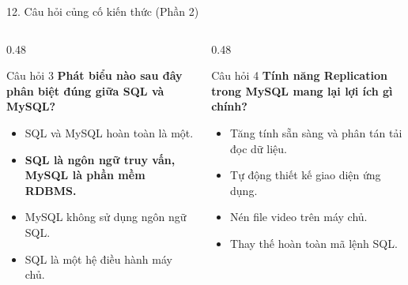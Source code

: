 \documentclass[aspectratio=169,11pt]{beamer}
\begin{document}
\begin{frame}{12. Câu hỏi củng cố kiến thức (Phần 2)}
\begin{columns}[t]
  \begin{column}{0.48\textwidth}
    \begin{exampleblock}{Câu hỏi 3}
      \textbf{Phát biểu nào sau đây phân biệt đúng giữa SQL và MySQL?}
      \begin{itemize}\small
        \item[A.] SQL và MySQL hoàn toàn là một.
        \item[B.] \textbf{SQL là ngôn ngữ truy vấn, MySQL là phần mềm RDBMS.} \quad \checkmark
        \item[C.] MySQL không sử dụng ngôn ngữ SQL.
        \item[D.] SQL là một hệ điều hành máy chủ.
      \end{itemize}
    \end{exampleblock}
  \end{column}
  \begin{column}{0.48\textwidth}
    \begin{exampleblock}{Câu hỏi 4}
      \textbf{Tính năng Replication trong MySQL mang lại lợi ích gì chính?}
      \begin{itemize}\small
        \item[A.] Tăng tính sẵn sàng và phân tán tải đọc dữ liệu. \quad \checkmark
        \item[B.] Tự động thiết kế giao diện ứng dụng.
        \item[C.] Nén file video trên máy chủ.
        \item[D.] Thay thế hoàn toàn mã lệnh SQL.
      \end{itemize}
    \end{exampleblock}
  \end{column}
\end{columns}
\end{frame}
\end{document}
